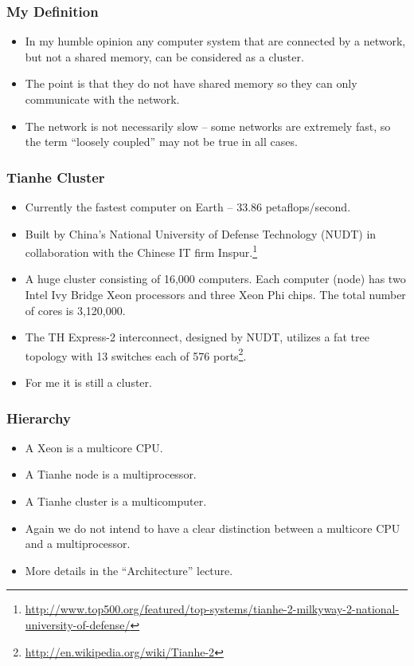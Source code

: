 \documentclass{beamer}
\begin{document}
\begin{CJK}{UTF8}{bsmi}
\begin{frame}
\frametitle{My Definition}
\begin{itemize}
\item In my humble opinion any computer system that are connected by a
  network, but not a shared memory, can be considered as a cluster.
\item The point is that they do not have shared memory so they can
  only communicate with the network.
\item The network is not necessarily slow -- some networks are
  extremely fast, so the term ``loosely coupled'' may not be true in
  all cases.
\end{itemize}
\end{frame}

\begin{frame}
\frametitle{Tianhe Cluster}
\begin{itemize}
\item Currently the fastest computer on Earth -- 33.86
  petaflops/second.
\item Built by China's National University of Defense Technology
  (NUDT) in collaboration with the Chinese IT firm
  Inspur.\footnote{\url{http://www.top500.org/featured/top-systems/tianhe-2-milkyway-2-national-university-of-defense/}}
\item A huge cluster consisting of 16,000 computers.  Each computer
  (node) has two Intel Ivy Bridge Xeon processors and three Xeon Phi
  chips. The total number of cores is 3,120,000.
\item The TH Express-2 interconnect, designed by NUDT, utilizes a fat
  tree topology with 13 switches each of 576 ports\footnote{\url{http://en.wikipedia.org/wiki/Tianhe-2}}.
\item For me it is still a cluster.
\end{itemize}
\end{frame}

\begin{frame}
\frametitle{Hierarchy}
\begin{itemize}
\item A Xeon is a multicore CPU.
\item A Tianhe node is a multiprocessor.
\item A Tianhe cluster is a multicomputer.
\item Again we do not intend to have a clear distinction between a
  multicore CPU and a multiprocessor.
\item More details in the ``Architecture'' lecture.
\end{itemize}
\end{frame}


\end{CJK}
\end{document}
